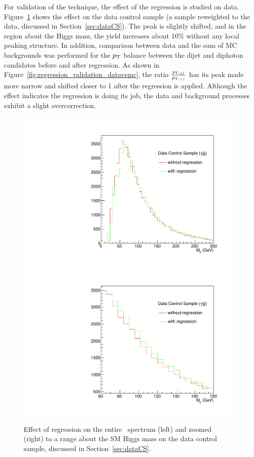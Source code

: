 For validation of the technique, the effect of the regression is studied on data.
Figure~\ref{fig:regression_plots_dataCS_mjj} shows the effect on the data control sample
(a \gjjj sample reweighted to the \ggjj data, discussed in Section~\ref{sec:dataCS}). The peak
is slightly shifted, and in the region about the Higgs mass, the yield increases about 10\% without
any local peaking structure. 
In addition, comparison between data and the sum of MC backgrounds was performed for the $p_{\rm T}$
balance between the dijet and diphoton candidates before and after regression.
As shown in Figure~\ref{fig:regression_validation_datavsmc}, the ratio
$\frac{p_{{\rm T},jj}}{p_{{\rm T},\gamma\gamma}}$ has its peak made more narrow and shifted closer
to 1 after the regression is applied. Although the effect indicates the regression is doing its job,
the data and background processes exhibit a slight overcorrection.

\begin{figure}[ht]
\begin{center}
\includegraphics[width=.4\textwidth]{figures/objects/dataCS_mjj.pdf}
\includegraphics[width=.4\textwidth]{figures/objects/dataCS_mjj_zoom.pdf}
\end{center}
\caption{Effect of regression on the entire \Mjj\, spectrum (left) and zoomed (right)
to a range about the SM Higgs mass on the data control sample, discussed in Section~\ref{sec:dataCS}.}
\label{fig:regression_plots_dataCS_mjj} 
\end{figure}

